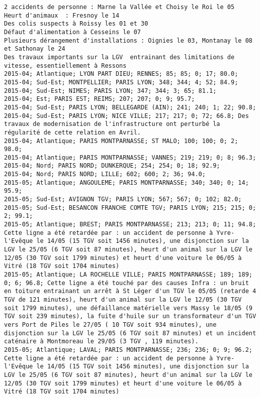 \documentclass{article}
\begin{document}
\begin{Verbatim}[commandchars=\\\{\}]
2 accidents de personne : Marne la Vallée et Choisy le Roi le 05
Heurt d'animaux  : Fresnoy le 14
Des colis suspects à Roissy les 01 et 30
Défaut d'alimentation à Cesseins le 07
Plusieurs dérangement d'installations : Oignies le 03, Montanay le 08 et Sathonay le 24
Des travaux importants sur la LGV  entrainant des limitations de vitesse, essentiellement à Ressons
2015-04; Atlantique; LYON PART DIEU; RENNES; 85; 85; 0; 17; 80.0; 
2015-04; Sud-Est; MONTPELLIER; PARIS LYON; 348; 344; 4; 52; 84.9; 
2015-04; Sud-Est; NIMES; PARIS LYON; 347; 344; 3; 65; 81.1; 
2015-04; Est; PARIS EST; REIMS; 207; 207; 0; 9; 95.7; 
2015-04; Sud-Est; PARIS LYON; BELLEGARDE (AIN); 241; 240; 1; 22; 90.8; 
2015-04; Sud-Est; PARIS LYON; NICE VILLE; 217; 217; 0; 72; 66.8; Des travaux de modernisation de l'infrastructure ont perturbé la régularité de cette relation en Avril.
2015-04; Atlantique; PARIS MONTPARNASSE; ST MALO; 100; 100; 0; 2; 98.0; 
2015-04; Atlantique; PARIS MONTPARNASSE; VANNES; 219; 219; 0; 8; 96.3; 
2015-04; Nord; PARIS NORD; DUNKERQUE; 254; 254; 0; 18; 92.9; 
2015-04; Nord; PARIS NORD; LILLE; 602; 600; 2; 36; 94.0; 
2015-05; Atlantique; ANGOULEME; PARIS MONTPARNASSE; 340; 340; 0; 14; 95.9; 
2015-05; Sud-Est; AVIGNON TGV; PARIS LYON; 567; 567; 0; 102; 82.0; 
2015-05; Sud-Est; BESANCON FRANCHE COMTE TGV; PARIS LYON; 215; 215; 0; 2; 99.1; 
2015-05; Atlantique; BREST; PARIS MONTPARNASSE; 213; 213; 0; 11; 94.8; Cette ligne a été retardée par : un accident de personne à Yvre-l'Evêque le 14/05 (15 TGV soit 1456 minutes), une disjonction sur la LGV le 25/05 (6 TGV soit 87 minutes), heurt d'un animal sur la LGV le 12/05 (30 TGV soit 1799 minutes) et heurt d'une voiture le 06/05 à Vitré (18 TGV soit 1704 minutes)
2015-05; Atlantique; LA ROCHELLE VILLE; PARIS MONTPARNASSE; 189; 189; 0; 6; 96.8; Cette ligne a été touché par des causes Infra : un bruit en toiture entrainant un arrêt à St Léger d'un TGV le 05/05 (retarde 4 TGV de 121 minutes), heurt d'un animal sur la LGV le 12/05 (30 TGV soit 1799 minutes), une défaillance matérielle vers Massy le 18/05 (9 TGV soit 239 minutes), la fuite d'huile sur un transformateur d'un TGV vers Port de Piles le 27/05 ( 10 TGV soit 934 minutes), une disjonction sur la LGV le 25/05 (6 TGV soit 87 minutes) et un incident caténaire à Montmoreau le 29/05 (3 TGV , 119 minutes). 
2015-05; Atlantique; LAVAL; PARIS MONTPARNASSE; 236; 236; 0; 9; 96.2; Cette ligne a été retardée par : un accident de personne à Yvre-l'Evêque le 14/05 (15 TGV soit 1456 minutes), une disjonction sur la LGV le 25/05 (6 TGV soit 87 minutes), heurt d'un animal sur la LGV le 12/05 (30 TGV soit 1799 minutes) et heurt d'une voiture le 06/05 à Vitré (18 TGV soit 1704 minutes)

\end{Verbatim}
\end{document}
